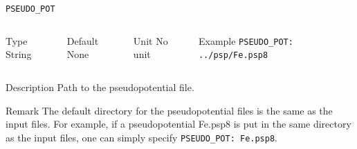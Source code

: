 \begin{frame}[allowframebreaks]{\texttt{PSEUDO\_POT}} \label{PSEUDO_POT}
\vspace*{-12pt}
\begin{columns}
\begin{block}{Type}
String
\end{block}

\begin{block}{Default}
None
\end{block}

\begin{block}{Unit}
No unit
\end{block}

\begin{block}{Example}
\texttt{PSEUDO\_POT: ../psp/Fe.psp8}  
\end{block}
\end{columns}

\begin{block}{Description}
Path to the pseudopotential file. 
\end{block}

\begin{block}{Remark}
The default directory for the pseudopotential files is the same as the input files. For example, if a pseudopotential Fe.psp8 is put in the same directory as the input files, one can simply specify \texttt{PSEUDO\_POT: Fe.psp8}. 
\end{block}

\end{frame}


